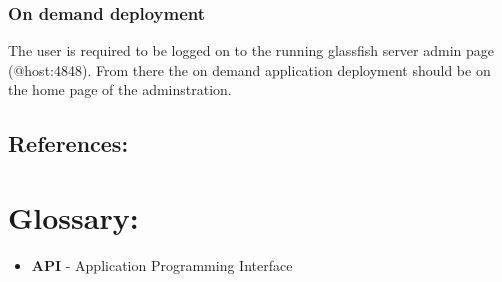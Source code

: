 \documentclass[12pt]{article}
\begin{document}
\subsubsection{On demand deployment}
The user is required to be logged on to the running glassfish server admin page (@host:4848). From there the on demand application deployment should be on the home page of the adminstration.

\subsection{References:}
\vspace{0.1in}
\vspace{0.5in}


\newpage
\section{Glossary:}
\vspace{0.2in}

\begin{itemize}

\item \textbf{API} - Application Programming Interface
 


\end{itemize}	
\end{document}
